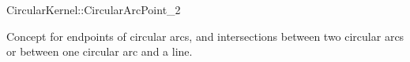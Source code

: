 \begin{ccRefConcept}{CircularKernel::CircularArcPoint_2}

\ccDefinition

Concept for endpoints of circular arcs, and intersections between two
circular arcs or between one circular arc and a line.

\ccHasModels
{}

\end{ccRefConcept}

